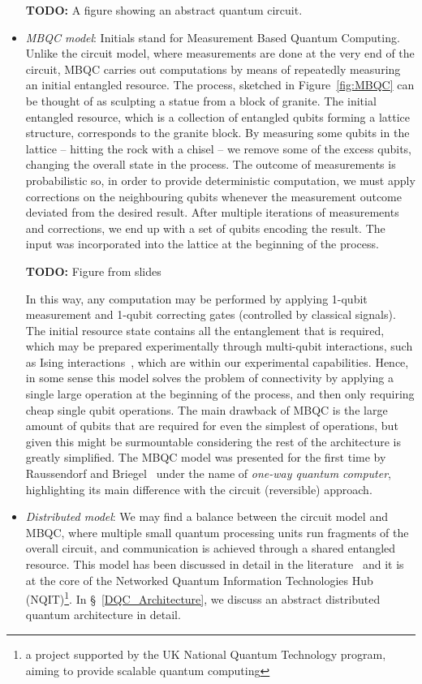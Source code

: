 \begin{itemize}
  \textbf{TODO:} A figure showing an abstract quantum circuit.

  \item \textit{MBQC model}: Initials stand for Measurement Based Quantum Computing. Unlike the circuit model, where measurements are done at the very end of the circuit, MBQC carries out computations by means of repeatedly measuring an initial entangled resource. The process, sketched in Figure~\ref{fig:MBQC} can be thought of as sculpting a statue from a block of granite. The initial entangled resource, which is a collection of entangled qubits forming a lattice structure, corresponds to the granite block. By measuring some qubits in the lattice -- hitting the rock with a chisel -- we remove some of the excess qubits, changing the overall state in the process. The outcome of measurements is probabilistic so, in order to provide deterministic computation, we must apply corrections on the neighbouring qubits whenever the measurement outcome deviated from the desired result. After multiple iterations of measurements and corrections, we end up with a set of qubits encoding the result. The input was incorporated into the lattice at the beginning of the process.

  \textbf{TODO:} Figure from slides %

  In this way, any computation may be performed by applying 1-qubit measurement and 1-qubit correcting gates (controlled by classical signals). The initial resource state contains all the entanglement that is required, which may be prepared experimentally through multi-qubit interactions, such as Ising interactions~\citep{1WQC}, which are within our experimental capabilities. Hence, in some sense this model solves the problem of connectivity by applying a single large operation at the beginning of the process, and then only requiring cheap single qubit operations. The main drawback of MBQC is the large amount of qubits that are required for even the simplest of operations, but given this might be surmountable considering the rest of the architecture is greatly simplified. The MBQC model was presented for the first time by Raussendorf and Briegel~\citep{1WQC} under the name of \textit{one-way quantum computer}, highlighting its main difference with the circuit (reversible) approach. 

  \item \textit{Distributed model}: We may find a balance between the circuit model and MBQC, where multiple small quantum processing units run fragments of the overall circuit, and communication is achieved through a shared entangled resource. This model has been discussed in detail in the literature~\citep{DistributedQCHW} and it is at the core of the Networked Quantum Information Technologies Hub (NQIT)\footnote{a project supported by the UK National Quantum Technology program, aiming to provide scalable quantum computing}. In \S~\ref{DQC_Architecture}, we discuss an abstract distributed quantum architecture in detail.

\end{itemize}


